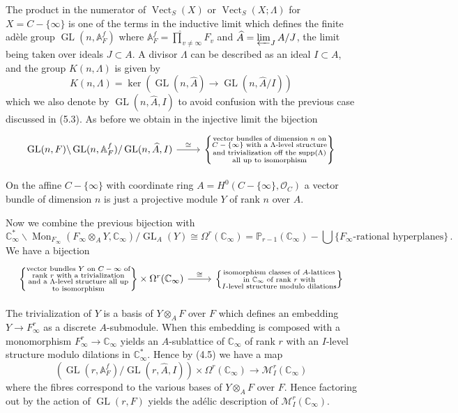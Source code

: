 \documentclass[12pt,a4paper]{article}
\theoremstyle{plain}
\theoremstyle{definition}
\theoremstyle{remark}
\DeclareMathOperator{\Mon}{Mon}
\DeclareMathOperator{\GL}{GL}
\DeclareMathOperator{\supp}{supp}
\DeclareMathOperator{\Vect}{Vect}
\begin{document}
The product in the numerator of $\Vect_S(X)$ or $\Vect_S(X;\Lambda)$ for 
$X = C - \{\infty\}$ is one of the terms in the inductive limit which defines 
the finite ad\`ele group $\GL(n,\mathbb{A}_F^f)$ where 
$\mathbb{A}_F^f = \widehat{\prod}_{v \neq \infty} F_v$ and 
$\widehat{A} = \varprojlim_{J} A/J$, the limit being taken over ideals 
$J \subset A$. A divisor $\Lambda$ can be described as an ideal $I \subset A$, 
and the group $K(n,\Lambda)$ is given by
\[
K(n,\Lambda) = \ker(\GL(n,\widehat{A}) \to \GL(n,\widehat{A}/I))
\]
which we also denote by $\GL(n,\widehat{A},I)$ to avoid confusion with the 
previous case discussed in (5.3). As before we obtain in the injective limit 
the bijection
\[
\begin{tikzcd}
\GL(n,F) \backslash \GL(n,\mathbb{A}_F^f)/\GL(n,\widehat{A},I) \arrow[r, "\cong"] & \left\{\substack{\text{vector bundles of dimension $n$ on}\\\text{$C - \{\infty\}$ with a $\Lambda$-level structure}\\\text{and trivialization off the $\supp(\Lambda)$}\\\text{all up to isomorphism}}\right\}
\end{tikzcd}
\]

On the affine $C - \{\infty\}$ with coordinate ring 
$A = H^0(C - \{\infty\}, \mathcal{O}_C)$ a vector bundle of dimension $n$ is 
just a projective module $Y$ of rank $n$ over $A$.

Now we combine the previous bijection with
\[
\mathbb{C}_\infty^* \backslash \Mon_{F_\infty}(F_\infty \otimes_A Y, \mathbb{C}_\infty)/\GL_A(Y) \cong \Omega^r(\mathbb{C}_\infty) = \mathbb{P}_{r-1}(\mathbb{C}_\infty) - \bigcup\{\text{$F_\infty$-rational hyperplanes}\} \,.
\]
We have a bijection
\[
\begin{tikzcd}
\left\{\substack{\text{vector bundles $Y$ on $C-\infty$ of}\\\text{rank $r$ with a trivialization}\\\text{and a $\Lambda$-level structure all up}\\\text{to isomorphism}}\right\} \times \Omega^r(\mathbb{C}_\infty) \arrow[r, "\cong"] & \left\{\substack{\text{isomorphism classes of $A$-lattices}\\\text{in $\mathbb{C}_\infty$ of rank $r$ with}\\\text{$I$-level structure modulo dilations}}\right\}
\end{tikzcd}
\]

The trivialization of $Y$ is a basis of $Y \otimes_A F$ over $F$ which defines 
an embedding $Y \to F_\infty^r$ as a discrete $A$-submodule. When this 
embedding is composed with a monomorphism $F_\infty^r \to \mathbb{C}_\infty$ yields 
an $A$-sublattice of $\mathbb{C}_\infty$ of rank $r$ with an $I$-level structure 
modulo dilations in $\mathbb{C}_\infty^*$. Hence by (4.5) we have a map
\[
(\GL(r,\mathbb{A}_F^f)/\GL(r,\widehat{A},I)) \times \Omega^r(\mathbb{C}_\infty) \to \mathcal{M}_I^r(\mathbb{C}_\infty)
\]
where the fibres correspond to the various bases of $Y \otimes_A F$ over $F$. 
Hence factoring out by the action of $\GL(r,F)$ yields the ad\'elic 
description of $\mathcal{M}_I^r(\mathbb{C}_\infty)$.
\end{document}
